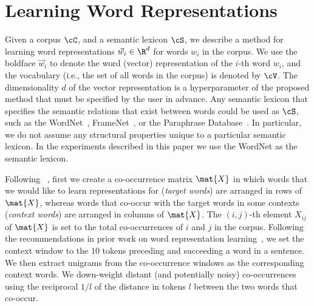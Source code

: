 \documentclass[letterpaper]{article}
\newcommand{\citet}[1]{\citeauthor{#1} \shortcite{#1}}
\newcommand{\citep}{\cite}
\begin{document}
\section{Learning Word Representations}
\label{sec:method}

Given a corpus $\cC$, and a semantic lexicon $\cS$, we describe a method for learning
word representations $\vec{w}_i \in \R^d$ for words $w_i$ in the corpus.
We use the boldface $\vec{w}_i$ to denote the word (vector) representation of
the $i$-th word $w_i$, and the vocabulary (i.e., the set of all words in the corpus) is denoted by $\cV$.
The dimensionality $d$ of the vector representation is a hyperparameter of the proposed method that must be
specified by the user in advance.  Any semantic lexicon that specifies the semantic relations that exist between words could be used as $\cS$,
such as the WordNet~\citep{WordNet}, FrameNet~\citep{baker-fillmore-lowe:1998:ACLCOLING}, or the Paraphrase Database~\citep{ganitkevitch-vandurme-callisonburch:2013:NAACL-HLT}. In particular, we do not assume any structural properties unique to a particular semantic lexicon. In the experiments described in this paper we use the WordNet as the semantic lexicon.

Following~\citet{Pennington:EMNLP:2014}, first we create a co-occurrence matrix $\mat{X}$ in which
words that we would like to learn representations for (\emph{target words}) are arranged in rows of $\mat{X}$, whereas words
that co-occur with the target words in some contexts (\emph{context words}) are arranged in columns of $\mat{X}$.
The $(i,j)$-th element $X_{ij}$ of $\mat{X}$ is set to the total co-occurrences of $i$ and $j$ in the corpus.
Following the recommendations in prior work on word representation learning~\citep{Levy:TACL:2015},
we set the context window to the $10$ tokens preceding and succeeding a word in a sentence.
We then extract unigrams from the co-occurrence windows
as the corresponding context words. We down-weight distant (and potentially noisy) co-occurrences
using the reciprocal $1/l$ of the distance in tokens $l$ between the two words that co-occur.
\end{document}
